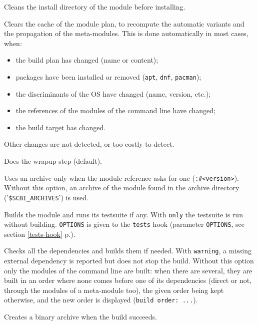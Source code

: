 \documentclass[a4paper,12pt,twoside]{article}
\newcommand{\code}[1]{\texttt{#1}}
\newcommand{\seeref}[1]{see section \ref{#1} p.\pageref{#1}}
\newcommand{\file}[1]{'{\texttt{#1}}'}
\newcommand{\ddash}{-{}-}
\begin{document}
\begin{description}[font=\texttt]
	\item[\ddash{}clean-install] Cleans the install directory of the module before installing.

	\item[\ddash{}clear-cache] Clears the cache of the module plan, to recompute the automatic variants and the propagation of the meta-modules. This is done automatically in most cases, when:
	\begin{itemize}
		\item the build plan has changed (name or content);
		\item packages have been installed or removed (\code{apt}, \code{dnf}, \code{pacman});
		\item the discriminants of the OS have changed (name, version, etc.);
		\item the references of the modules of the command line have changed;
		\item the build target has changed.
	\end{itemize}
	Other changes are not detected, or too costly to detect.

	\item[-w | \ddash{}wrapup] Does the wrapup step (default).

	\item[\ddash{}archive] Uses an archive only when the module reference asks for one (\code{:\#<version>}). Without this option, an archive of the module found in the archive directory (\file{\$SCBI\_ARCHIVES}) is used.

	\item[\ddash{}tests{[:only]}{[=OPTIONS]}] Builds the module and runs its testsuite if any. With \code{only} the testsuite is run without building. \code{OPTIONS} is given to the \code{tests} hook (parameter \code{OPTIONS}, \seeref{tests-hook}).

	\item[-d | \ddash{}deps{[:warning]}] Checks all the dependencies and builds them if needed. With \code{warning}, a missing external dependency is reported but does not stop the build. Without this option only the modules of the command line are built: when there are several, they are built in an order where none comes before one of its dependencies (direct or not, through the modules of a meta-module too), the given order being kept otherwise, and the new order is displayed (\code{build order: ...}).

	\item[-a | \ddash{}create-archive] Creates a binary archive when the build succeeds.


\end{description}
\end{document}
